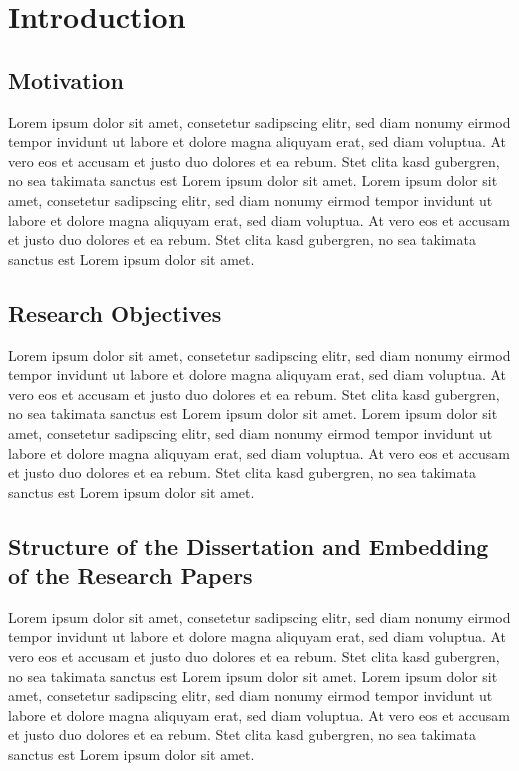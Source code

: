 \chapter{Introduction}
\label{cha:Introduction}

\section{Motivation}
\label{sec:Motivation}

Lorem ipsum dolor sit amet, consetetur sadipscing elitr, sed diam nonumy eirmod tempor invidunt ut labore et dolore magna aliquyam erat, sed diam voluptua. At vero eos et accusam et justo duo dolores et ea rebum. Stet clita kasd gubergren, no sea takimata sanctus est Lorem ipsum dolor sit amet. Lorem ipsum dolor sit amet, consetetur sadipscing elitr, sed diam nonumy eirmod tempor invidunt ut labore et dolore magna aliquyam erat, sed diam voluptua. At vero eos et accusam et justo duo dolores et ea rebum. Stet clita kasd gubergren, no sea takimata sanctus est Lorem ipsum dolor sit amet.

\section{Research Objectives}

Lorem ipsum dolor sit amet, consetetur sadipscing elitr, sed diam nonumy eirmod tempor invidunt ut labore et dolore magna aliquyam erat, sed diam voluptua. At vero eos et accusam et justo duo dolores et ea rebum. Stet clita kasd gubergren, no sea takimata sanctus est Lorem ipsum dolor sit amet. Lorem ipsum dolor sit amet, consetetur sadipscing elitr, sed diam nonumy eirmod tempor invidunt ut labore et dolore magna aliquyam erat, sed diam voluptua. At vero eos et accusam et justo duo dolores et ea rebum. Stet clita kasd gubergren, no sea takimata sanctus est Lorem ipsum dolor sit amet.

\section{Structure of the Dissertation and Embedding of the Research Papers}

Lorem ipsum dolor sit amet, consetetur sadipscing elitr, sed diam nonumy eirmod tempor invidunt ut labore et dolore magna aliquyam erat, sed diam voluptua. At vero eos et accusam et justo duo dolores et ea rebum. Stet clita kasd gubergren, no sea takimata sanctus est Lorem ipsum dolor sit amet. Lorem ipsum dolor sit amet, consetetur sadipscing elitr, sed diam nonumy eirmod tempor invidunt ut labore et dolore magna aliquyam erat, sed diam voluptua. At vero eos et accusam et justo duo dolores et ea rebum. Stet clita kasd gubergren, no sea takimata sanctus est Lorem ipsum dolor sit amet.

